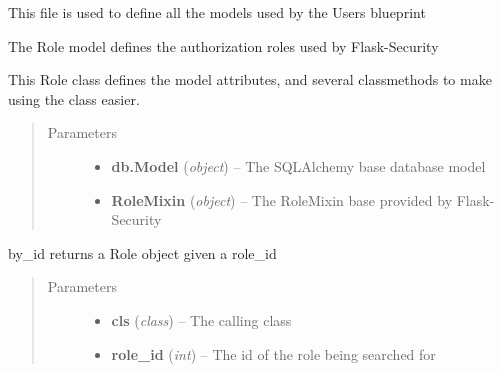 \documentclass[letterpaper,10pt,english]{sphinxmanual}
\begin{document}
This file is used to define all the models used by the Users blueprint

\begin{fulllineitems}
\label{dev-users:cagenix.users.models.Role}
The Role model defines the authorization roles used by Flask-Security

This Role class defines the model attributes, and several classmethods to
make using the class easier.
\begin{quote}\begin{description}
\item[{Parameters}] \leavevmode\begin{itemize}
\item {} 
\textbf{db.Model} (\emph{object}) -- The SQLAlchemy base database model

\item {} 
\textbf{RoleMixin} (\emph{object}) -- The RoleMixin base provided by Flask-Security

\end{itemize}

\end{description}\end{quote}

\begin{fulllineitems}
\label{dev-users:cagenix.users.models.Role.by_id}
by\_id returns a Role object given a role\_id
\begin{quote}\begin{description}
\item[{Parameters}] \leavevmode\begin{itemize}
\item {} 
\textbf{cls} (\emph{class}) -- The calling class

\item {} 
\textbf{role\_id} (\emph{int}) -- The id of the role being searched for

\end{itemize}

\end{description}\end{quote}

\end{fulllineitems}


\end{fulllineitems}
\end{document}
